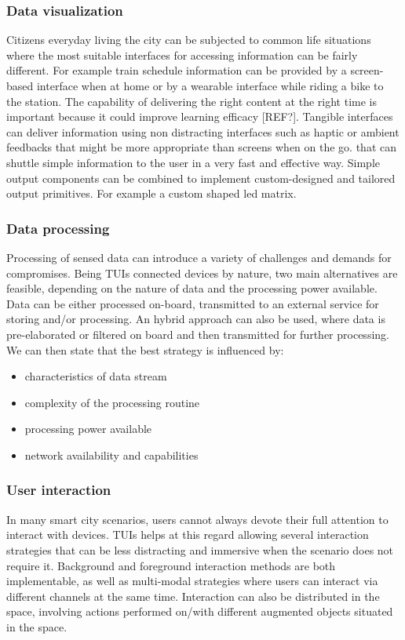 \subsubsection{Data visualization}
Citizens everyday living the city can be subjected to common life situations where the most suitable interfaces for accessing information can be fairly different. For example train schedule information can be provided by a screen-based interface when at home or by a wearable interface while riding a bike to the station. The capability of delivering the right content at the right time is important because it could improve learning efficacy [REF?]. Tangible interfaces can deliver information using non distracting interfaces such as haptic or ambient feedbacks that might be more appropriate than screens when on the go. that can shuttle simple information to the user in a very fast and effective way.
Simple output components can be combined to implement custom-designed and tailored output primitives. For example a custom shaped led matrix.

\subsubsection{Data processing} %
Processing of sensed data can introduce a variety of challenges and demands for compromises. Being TUIs connected devices by nature, two main alternatives are feasible, depending on the nature of data and the processing power available. Data can be either processed on-board, transmitted to an external service for storing and/or processing. An hybrid approach can also be used, where data is pre-elaborated or filtered on board and then transmitted for further processing.
We can then state that the best strategy is influenced by:
\begin{itemize}
    \item characteristics of data stream
    \item complexity of the processing routine
    \item processing power available
    \item network availability and capabilities
\end{itemize}

\subsubsection{User interaction} %
In many smart city scenarios, users cannot always devote their full attention to interact with devices. TUIs helps at this regard allowing several interaction strategies that can be less distracting and immersive when the scenario does not require it.
Background and foreground interaction methods are both implementable, as well as multi-modal strategies where users can interact via different channels at the same time. Interaction can also be distributed in the space, involving actions performed on/with different augmented objects situated in the space.

